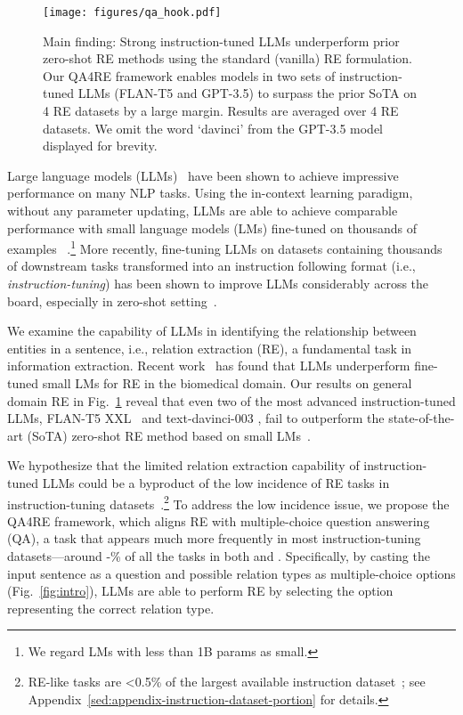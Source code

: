
\begin{figure}[!t]
 \centering
 \small
 \texttt{[image: figures/qa\_hook.pdf]}
\caption{Main finding: Strong instruction-tuned LLMs underperform prior zero-shot RE methods using the standard (vanilla) RE formulation. Our QA4RE framework enables models in two sets of instruction-tuned LLMs (FLAN-T5 and GPT-3.5) to surpass the prior SoTA on 4 RE datasets by a large margin. Results are averaged over 4 RE datasets. We omit the word `davinci' from the GPT-3.5 model displayed for brevity.}
        \label{fig:hook-figure}
\vspace{-5pt}
\end{figure}

Large language models (LLMs)~\cite{Brown2020GPT3, Chowdhery2022PaLM, Zhang2022OPT} have been shown to achieve impressive performance on many NLP tasks. 
Using the in-context learning paradigm, without any parameter updating, LLMs are able to achieve comparable performance with small language models (LMs) fine-tuned on thousands of examples ~\cite{Liu2022KATE, Min2022Channel, Liang2022HolisticEO}.\footnote{We regard LMs with less than 1B params as small.}
More recently, fine-tuning LLMs on datasets containing thousands of downstream tasks transformed into an instruction following format (i.e., \textit{instruction-tuning}) has been shown to improve LLMs considerably across the board, especially in zero-shot setting~\cite{Iyer2022OPT-IML, Ouyang2022InstructGPT, ChungFlanT5}. 

We examine the capability of LLMs in identifying the relationship between entities in a sentence, i.e., relation extraction (RE), a fundamental task in information extraction.
Recent work~\cite{Gutierrez2022GPT3BioIE} has found that LLMs underperform fine-tuned small LMs for RE in the biomedical domain. 
Our results on general domain RE in Fig.~\ref{fig:hook-figure} reveal that even two of the most advanced instruction-tuned LLMs, FLAN-T5 XXL~\cite{ChungFlanT5} and text-davinci-003 \cite{Ouyang2022InstructGPT}, fail to outperform the state-of-the-art (SoTA) zero-shot RE method based on small LMs~\cite{Sainz2021NLI}.








We hypothesize that the limited relation extraction capability of instruction-tuned LLMs could be a byproduct of the low incidence of RE tasks in instruction-tuning datasets~\cite{Ouyang2022InstructGPT, Sanh2022T0, ChungFlanT5, Wang2022SuperInstructions}.\footnote{RE-like tasks are <0.5\% of the largest available instruction dataset~\cite{Wang2022SuperInstructions}; see Appendix~\ref{sed:appendix-instruction-dataset-portion} for details.}
To address the low incidence issue, we propose the QA4RE framework, which aligns RE with multiple-choice question answering (QA), a task that appears much more frequently in most instruction-tuning datasets---around -\% of all the tasks in both \citet{Wang2022SuperInstructions} and \citet{Ouyang2022InstructGPT}. 
Specifically, by casting the input sentence as a question and possible relation types as multiple-choice options (Fig.~\ref{fig:intro}), LLMs are able to perform RE by selecting the option representing the correct relation type.

